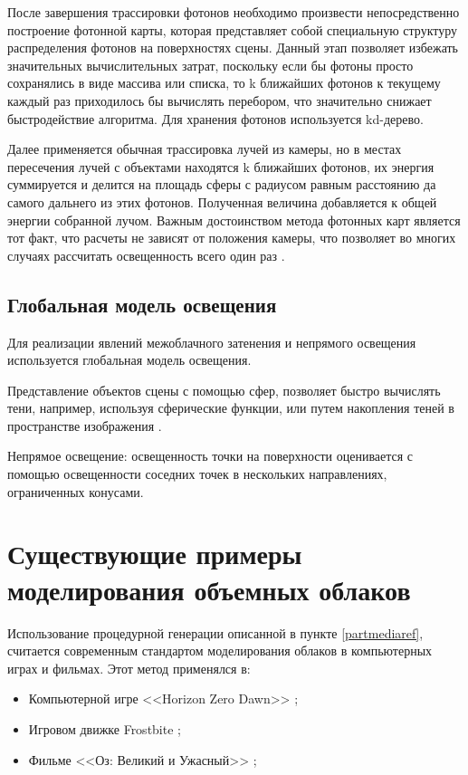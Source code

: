 После  завершения  трассировки  фотонов  необходимо  произвести  непосредственно 
построение  фотонной  карты,  которая  представляет  собой  специальную  структуру 
распределения  фотонов  на  поверхностях  сцены.  Данный  этап  позволяет  избежать 
значительных вычислительных затрат, поскольку если бы фотоны просто сохранялись в виде 
массива  или  списка,  то  k  ближайших  фотонов  к  текущему  каждый  раз  приходилось  бы 
вычислять перебором, что значительно снижает быстродействие алгоритма. Для хранения фотонов используется kd-дерево.

Далее применяется обычная трассировка лучей из камеры, но в местах пересечения лучей с объектами находятся k ближайших фотонов, их энергия суммируется и делится на площадь сферы с радиусом равным расстоянию да самого дальнего из этих фотонов. Полученная величина добавляется к общей энергии собранной лучом. Важным  достоинством  метода  фотонных  карт  является  тот  факт,  что  расчеты  не 
зависят  от  положения  камеры,  что  позволяет во  многих  случаях  рассчитать  освещенность 
всего  один  раз \cite{photon}.

\subsection{Глобальная модель освещения}

Для реализации явлений межоблачного затенения и непрямого освещения используется глобальная модель освещения.

Представление объектов сцены с помощью сфер, позволяет быстро вычислять тени, например, используя сферические функции, или путем накопления теней в пространстве изображения \cite{clouds}.

Непрямое освещение: освещенность точки на поверхности оценивается с помощью освещенности соседних точек в нескольких направлениях, ограниченных конусами.


\section{Существующие примеры моделирования объемных облаков}

Использование процедурной генерации описанной в пункте \ref{partmediaref}, считается современным стандартом моделирования облаков в компьютерных играх и фильмах. Этот метод применялся в:
\begin{itemize}
	\item Компьютерной игре <<Horizon Zero Dawn>> \cite{hzd};
	\item Игровом движке Frostbite \cite{frostbite};
	\item Фильме <<Оз: Великий и Ужасный>> \cite{oz};
\end{itemize}










